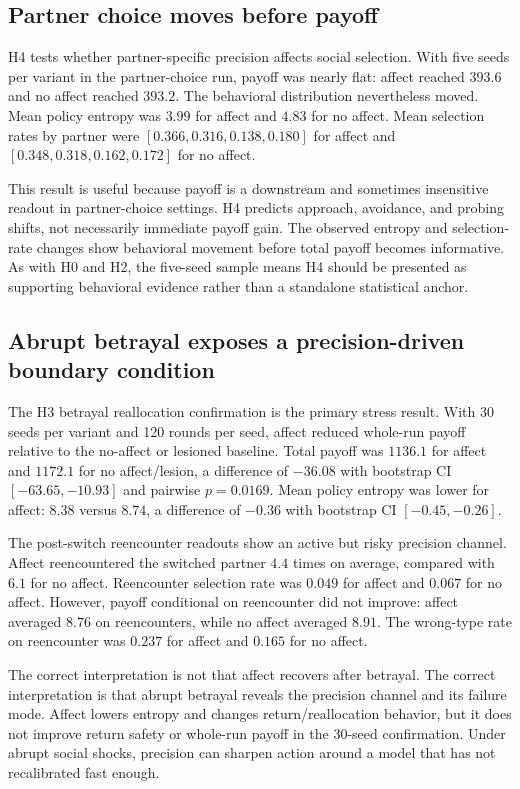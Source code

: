 \subsection{Partner choice moves before payoff}

H4 tests whether partner-specific precision affects social selection. With five seeds per variant in the partner-choice run, payoff was nearly flat: affect reached $393.6$ and no affect reached $393.2$. The behavioral distribution nevertheless moved. Mean policy entropy was $3.99$ for affect and $4.83$ for no affect. Mean selection rates by partner were $[0.366, 0.316, 0.138, 0.180]$ for affect and $[0.348, 0.318, 0.162, 0.172]$ for no affect.

This result is useful because payoff is a downstream and sometimes insensitive readout in partner-choice settings. H4 predicts approach, avoidance, and probing shifts, not necessarily immediate payoff gain. The observed entropy and selection-rate changes show behavioral movement before total payoff becomes informative. As with H0 and H2, the five-seed sample means H4 should be presented as supporting behavioral evidence rather than a standalone statistical anchor.

\subsection{Abrupt betrayal exposes a precision-driven boundary condition}

The H3 betrayal reallocation confirmation is the primary stress result. With 30 seeds per variant and 120 rounds per seed, affect reduced whole-run payoff relative to the no-affect or lesioned baseline. Total payoff was $1136.1$ for affect and $1172.1$ for no affect/lesion, a difference of $-36.08$ with bootstrap CI $[-63.65, -10.93]$ and pairwise $p=0.0169$. Mean policy entropy was lower for affect: $8.38$ versus $8.74$, a difference of $-0.36$ with bootstrap CI $[-0.45, -0.26]$.

The post-switch reencounter readouts show an active but risky precision channel. Affect reencountered the switched partner $4.4$ times on average, compared with $6.1$ for no affect. Reencounter selection rate was $0.049$ for affect and $0.067$ for no affect. However, payoff conditional on reencounter did not improve: affect averaged $8.76$ on reencounters, while no affect averaged $8.91$. The wrong-type rate on reencounter was $0.237$ for affect and $0.165$ for no affect.

The correct interpretation is not that affect recovers after betrayal. The correct interpretation is that abrupt betrayal reveals the precision channel and its failure mode. Affect lowers entropy and changes return/reallocation behavior, but it does not improve return safety or whole-run payoff in the 30-seed confirmation. Under abrupt social shocks, precision can sharpen action around a model that has not recalibrated fast enough.

